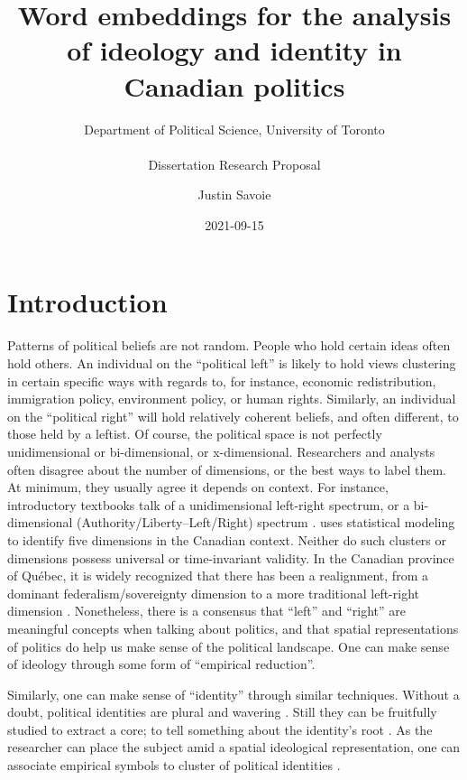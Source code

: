 \documentclass[
  openany]{book}
\title{Word embeddings for the analysis of ideology and identity in Canadian politics}
\subtitle{\hfill\break
Department of Political Science, University of Toronto\\
~\\
Dissertation Research Proposal}
\author{Justin Savoie}
\date{2021-09-15}
\begin{document}
\maketitle

{
\setcounter{tocdepth}{1}
\tableofcontents
}
\hypertarget{intro}{%
\chapter{Introduction}\label{intro}}

Patterns of political beliefs are not random. People who hold certain ideas often hold others. An individual on the ``political left'' is likely to hold views clustering in certain specific ways with regards to, for instance, economic redistribution, immigration policy, environment policy, or human rights. Similarly, an individual on the ``political right'' will hold relatively coherent beliefs, and often different, to those held by a leftist. Of course, the political space is not perfectly unidimensional or bi-dimensional, or x-dimensional. Researchers and analysts often disagree about the number of dimensions, or the best ways to label them. At minimum, they usually agree it depends on context. For instance, introductory textbooks talk of a unidimensional left-right spectrum, or a bi-dimensional (Authority/Liberty--Left/Right) spectrum \citep{heywood2017political}. \citet{heroux2016substate} uses statistical modeling to identify five dimensions in the Canadian context. Neither do such clusters or dimensions possess universal or time-invariant validity. In the Canadian province of Québec, it is widely recognized that there has been a realignment, from a dominant federalism/sovereignty dimension to a more traditional left-right dimension \citep{montigny2016fin}. Nonetheless, there is a consensus that ``left'' and ``right'' are meaningful concepts when talking about politics, and that spatial representations of politics do help us make sense of the political landscape. One can make sense of ideology through some form of ``empirical reduction''.

Similarly, one can make sense of ``identity'' through similar techniques. Without a doubt, political identities are plural and wavering \citep[\citet{ozkirimli2017theories}]{hobsbawm2012invention}. Still they can be fruitfully studied to extract a core; to tell something about the identity's root \citep{schwartz1967public}. As the researcher can place the subject amid a spatial ideological representation, one can associate empirical symbols to cluster of political identities \citep{dufresne2019symbolic}.
\end{document}
